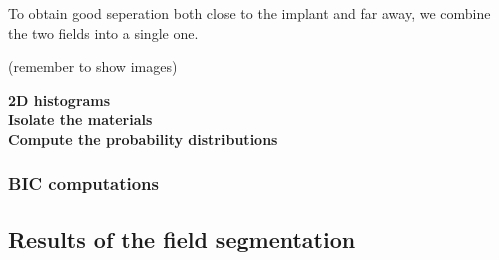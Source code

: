 To obtain good seperation both close to the implant and far away, we combine the two fields into a single one.

(remember to show images)

\vspace{\baselineskip}
\noindent\textbf{2D histograms} \\

\vspace{\baselineskip}
\noindent\textbf{Isolate the materials} \\

\vspace{\baselineskip}
\noindent\textbf{Compute the probability distributions} \\

\subsubsection{BIC computations}

\subsection{Results of the field segmentation}

